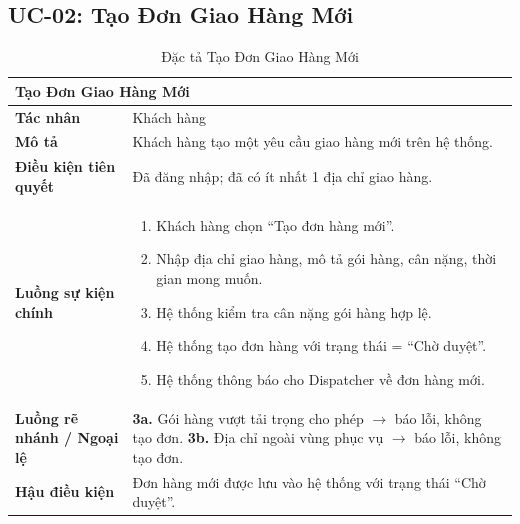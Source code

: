 \subsection{UC-02: Tạo Đơn Giao Hàng Mới}
\begin{table}[H]
  \centering
  \begin{tabularx}{\textwidth}{|l|X|}
    \hline
    \multicolumn{2}{|l|}{\textbf{Tạo Đơn Giao Hàng Mới}} \\
    \hline
    \textbf{Tác nhân}           & Khách hàng \\ \hline
    \textbf{Mô tả}              & Khách hàng tạo một yêu cầu giao hàng mới trên hệ thống. \\ \hline
    \textbf{Điều kiện tiên quyết} & Đã đăng nhập; đã có ít nhất 1 địa chỉ giao hàng. \\ \hline
    \textbf{Luồng sự kiện chính} &
      \begin{enumerate}[leftmargin=*, nosep, topsep=0pt]
        \item Khách hàng chọn ``Tạo đơn hàng mới''.
        \item Nhập địa chỉ giao hàng, mô tả gói hàng, cân nặng, thời gian mong muốn.
        \item Hệ thống kiểm tra cân nặng gói hàng hợp lệ.
        \item Hệ thống tạo đơn hàng với trạng thái = ``Chờ duyệt''.
        \item Hệ thống thông báo cho Dispatcher về đơn hàng mới.
      \end{enumerate} \\ \hline
    \textbf{Luồng rẽ nhánh / Ngoại lệ} &
      \textbf{3a.} Gói hàng vượt tải trọng cho phép $\rightarrow$ báo lỗi, không tạo đơn.
      \newline
      \textbf{3b.} Địa chỉ ngoài vùng phục vụ $\rightarrow$ báo lỗi, không tạo đơn. \\ \hline
    \textbf{Hậu điều kiện}      & Đơn hàng mới được lưu vào hệ thống với trạng thái ``Chờ duyệt''. \\
    \hline
  \end{tabularx}
  \caption{Đặc tả Tạo Đơn Giao Hàng Mới}
  \label{tab:uc02}
\end{table}

